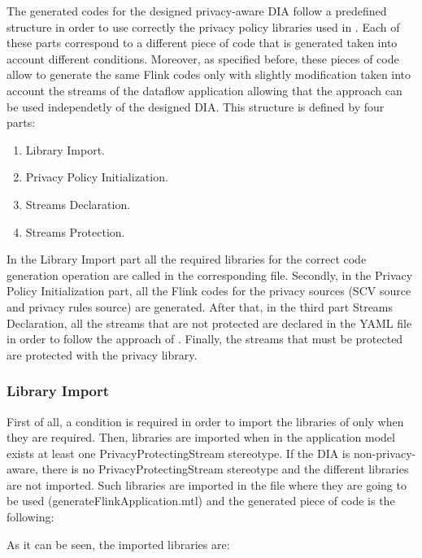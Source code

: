 The generated codes for the designed privacy-aware DIA follow a predefined structure in order to use correctly the privacy policy libraries used in \cite{privacypoliciesarticle}. Each of these parts correspond to a different piece of code that is generated taken into account different conditions. Moreover, as specified before, these pieces of code allow to generate the same Flink codes only with slightly modification taken into account the streams of the dataflow application allowing that the approach can be used independetly of the designed DIA. This structure is defined by four parts:

\begin{enumerate}
\item Library Import.
\item Privacy Policy Initialization.
\item Streams Declaration.
\item Streams Protection.
\end{enumerate}

In the Library Import part all the required libraries for the correct code generation operation are called in the corresponding file. Secondly, in the Privacy Policy Initialization part, all the Flink codes for the privacy sources (SCV source and privacy rules source) are generated. After that, in the third part Streams Declaration, all the streams that are not protected are declared in the YAML file in order to follow the approach of \cite{privacypoliciesarticle}. Finally, the streams that must be protected are protected with the privacy library.

\subsubsection{Library Import}

First of all, a condition is required in order to import the libraries of \cite{privacypoliciesarticle} only when they are required. Then, libraries are imported when in the application model exists at least one PrivacyProtectingStream stereotype. If the DIA is non-privacy-aware, there is no PrivacyProtectingStream stereotype and the different libraries are not imported. Such libraries are imported in the file where they are going to be used (generateFlinkApplication.mtl) and the generated piece of code is the following:



As it can be seen, the imported libraries are:

